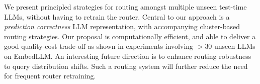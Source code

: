 We present principled strategies for routing amongst multiple unseen test-time LLMs,
without having to retrain the router. 
Central to our approach is a \emph{prediction correctness} LLM representation,
with accompanying cluster-based routing strategies.
Our proposal is computationally efficient, and able to deliver a good quality-cost trade-off as shown in experiments involving $>30$ unseen LLMs on EmbedLLM.
An interesting future direction is to 
enhance routing robustness to query distribution shifts. 
Such a routing system  will further reduce the need for frequent router retraining.

